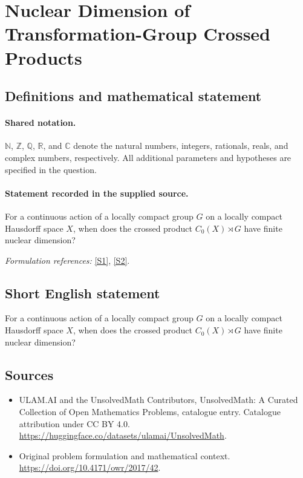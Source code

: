 \documentclass[11pt]{article}
\newcommand{\sref}[2]{\hyperlink{source:#1:#2}{[S#2]}}
\begin{document}
\section{Nuclear Dimension of Transformation-Group Crossed Products}\label{statement}

\subsection{Definitions and mathematical statement}

\paragraph{Shared notation.}$\mathbb N$, $\mathbb Z$, $\mathbb Q$, $\mathbb R$, and $\mathbb C$ denote the natural numbers, integers, rationals, reals, and complex numbers, respectively. All additional parameters and hypotheses are specified in the question.


\paragraph{Statement recorded in the supplied source.}
For a continuous action of a locally compact group $G$ on a locally compact Hausdorff space $X$, when does the crossed product $C_0(X)\rtimes G$ have finite nuclear dimension?
\par\smallskip\textit{Formulation references:} \sref{statement}{1}, \sref{statement}{2}.
\subsection{Short English statement}
For a continuous action of a locally compact group $G$ on a locally compact Hausdorff space $X$, when does the crossed product $C_0(X)\rtimes G$ have finite nuclear dimension?
\subsection{Sources}
\begin{itemize}
\item[\hypertarget{source:statement:1}{S1}] ULAM.AI and the UnsolvedMath Contributors, UnsolvedMath: A Curated Collection of Open Mathematics Problems, catalogue entry. Catalogue attribution under CC BY 4.0.
\url{https://huggingface.co/datasets/ulamai/UnsolvedMath}.
\item[\hypertarget{source:statement:2}{S2}] Original problem formulation and mathematical context.
\url{https://doi.org/10.4171/owr/2017/42}.
\end{itemize}
\label{end:statement}
\end{document}
